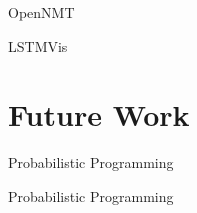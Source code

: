 \begin{frame}{OpenNMT}

\end{frame}

\begin{frame}{LSTMVis}

\end{frame}



\section{Future Work}

\begin{frame}{Probabilistic Programming}

\end{frame}

\begin{frame}{Probabilistic Programming}

\end{frame}


\begin{frame}

\end{frame}
